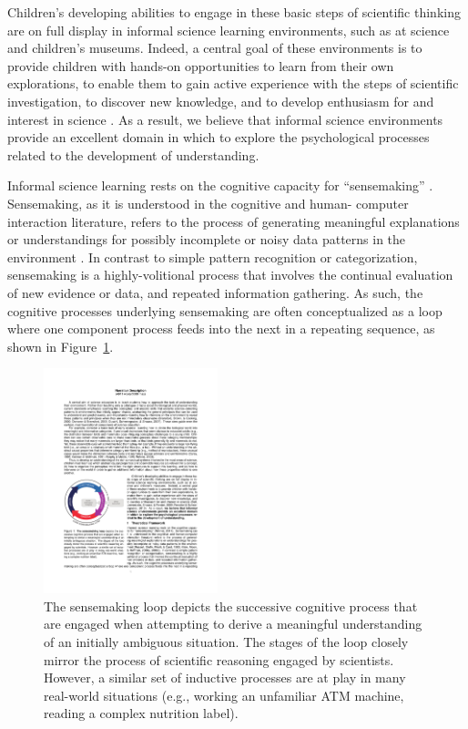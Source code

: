 \documentclass[man,floatsintext]{apa6}
\begin{document}
Children's developing abilities to engage in these basic steps of scientific 
thinking are on full display in informal science learning environments, such as at 
science and children's museums. Indeed, a central goal of these environments is to 
provide children with hands-on opportunities to learn from their own explorations, to 
enable them to gain active experience with the steps of scientific investigation, to 
discover new knowledge, and to develop enthusiasm for and interest in science 
\cite{Bell:2009,Fenichel:2010}. As a result, we believe that informal science 
environments provide an excellent domain in which to explore the psychological 
processes related to the development of understanding.

Informal science learning rests on the cognitive capacity for ``sensemaking'' 
\cite{Renner:2011}. Sensemaking, as it is understood in the cognitive and human-
computer interaction literature, refers to the process of generating meaningful 
explanations or understandings for possibly incomplete or noisy data patterns in the 
environment \cite{Russell:1993,Klein:2006a,Klein:2006b}. In contrast to simple 
pattern recognition or categorization, sensemaking is a highly-volitional process that 
involves the continual evaluation of new evidence or data, and repeated information 
gathering. As such, the cognitive processes underlying sensemaking are often 
conceptualized as a loop where one component process feeds into the next in a 
repeating sequence, as shown in Figure~\ref{fig:sensemaking_loop}.

\begin{figure}[!h]
  \centering
  \includegraphics[width=0.45\textwidth]{figures/sensemaking_loop}
  \caption{The sensemaking loop depicts the successive cognitive process that are 
engaged when attempting to derive a meaningful understanding of an initially 
ambiguous situation. The stages of the loop closely mirror the process of scientific 
reasoning engaged by scientists. However, a similar set of inductive processes are 
at play in many real-world situations (e.g., working an unfamiliar ATM machine, 
reading a complex nutrition label).}
  \label{fig:sensemaking_loop}
\end{figure} 
\end{document}
